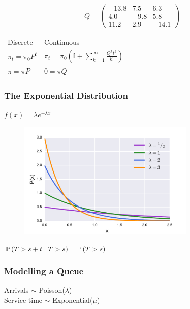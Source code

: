 \documentclass{beamer}
\begin{document}
\begin{frame}
\huge{
\begin{equation*}
 Q =  \left( \begin{array}{ccc}
-13.8 & 7.5 & 6.3 \\
4.0 & -9.8 & 5.8 \\
11.2 & 2.9 & -14.1 \end{array} \right)
\end{equation*}
}
\end{frame}



\begin{frame}
\begin{center}
\begin{tabular}{p{3cm}|p{5.5cm}}
\Large Discrete & \Large Continuous \\[5ex]
\Large $ \pi_t = \pi_0P^{t} $ & \Large $ \pi_t = \pi_0\left(\mathbb{I} + \sum_{k=1}^{\infty}\frac{Q^kt^k}{k!}\right) $ \\[5ex]
\Large $ \pi = \pi P $ & \Large $ 0 = \pi Q $ \\[5ex]
\end{tabular}
\end{center}
\end{frame}


\begin{frame}
\frametitle{The Exponential Distribution}
\begin{center}
$f(x) = \lambda e^{-\lambda x}$
\begin{figure}
\includegraphics[width=0.75\textwidth]{expon_dist}
\end{figure}
$\mathbb{P}\left(T > s + t \nonscript\; | \nonscript\; T > s\right) = \mathbb{P}\left(T > s\right)$
\end{center}
\end{frame}


\begin{frame}
\frametitle{Modelling a Queue}
\begin{figure}
  
\end{figure}

\begin{tcolorbox}[colback=orange!25!yellow!25,colframe=orange!50!yellow]
\begin{center}
Arrivals $\sim$ Poisson($\lambda$)\\
Service time $\sim$ Exponential($\mu$)
\end{center}
\end{tcolorbox}
\end{frame}
\end{document}
